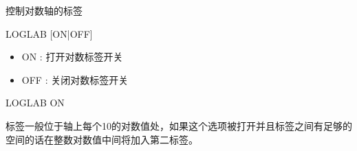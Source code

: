 \label{cmd:loglab}

控制对数轴的标签

\begin{SACSTX}
LOGLAB [ON|OFF]
\end{SACSTX}

\begin{itemize}
\item ON : 打开对数标签开关 
\item OFF : 关闭对数标签开关 
\end{itemize}

\begin{SACDFT}
LOGLAB ON
\end{SACDFT}

标签一般位于轴上每个10的对数值处，如果这个选项被打开并且标签之间有足够的空间的话在整数对数值中间将加入第二标签。
